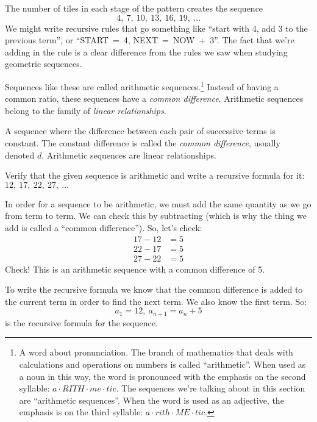 The number of tiles in each stage of the pattern creates the sequence \[4,~ 7,~ 10,~ 13,~ 16,~ 19,~\dotsc\] We might write recursive rules that go something like ``start with 4, add 3 to the previous term'', or ``START~=~4, NEXT~=~NOW~+~3''. The fact that we're adding in the rule is a clear difference from the rules we saw when studying geometric sequences.


Sequences like these are called \glspl{arithmetic sequence}.\footnote{A word about pronunciation. The branch of mathematics that deals with calculations and operations on numbers is called ``arithmetic''. When used as a noun in this way, the word is pronounced with the emphasis on the second syllable: $a \cdot RITH \cdot me \cdot tic$. The sequences we're talking about in this section are ``arithmetic sequences''. When the word is used as an adjective, the emphasis is on the third syllable: $a \cdot rith \cdot ME \cdot tic$.} Instead of having a common ratio, these sequences have a \textit{common difference}. Arithmetic sequences belong to the family of \textit{linear relationships}.

\begin{boxeddef}
A sequence where the difference between each pair of successive terms is constant. The constant difference is called the \textit{common difference}, usually denoted $d$. Arithmetic sequences are linear relationships.
\end{boxeddef}

\begin{boxedex}
Verify that the given sequence is arithmetic and write a recursive formula for it: $12,~17,~ 22,~ 27,~\dotsc$

\exsoln{} In order for a sequence to be arithmetic, we must add the same quantity as we go from term to term. We can check this by subtracting (which is why the thing we add is called a ``common difference''). So, let's check: \[\begin{aligned}17-12 &= 5\\22-17 &= 5\\27-22 &= 5\end{aligned}\]
Check! This is an arithmetic sequence with a common difference of 5.

To write the recursive formula we know that the common difference is added to the current term in order to find the next term. We also know the first term. So: \[a_1 = 12, ~ a_{n+1} = a_n + 5\]
is the recursive formula for the sequence.
\end{boxedex}


